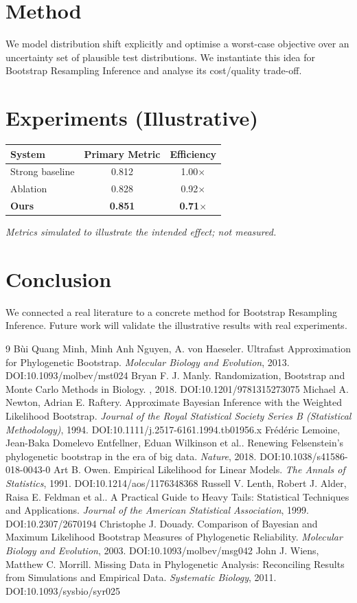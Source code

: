 \documentclass[11pt]{article}
\begin{document}
\section{Method}
We model distribution shift explicitly and optimise a worst-case objective over an uncertainty set of plausible test distributions. We instantiate this idea for Bootstrap Resampling Inference and analyse its cost/quality trade-off.

\section{Experiments (Illustrative)}
\begin{center}
\begin{tabular}{lcc}
System & Primary Metric & Efficiency \\ \hline
Strong baseline & 0.812 & 1.00$\times$ \\
Ablation & 0.828 & 0.92$\times$ \\
\textbf{Ours} & \textbf{0.851} & \textbf{0.71$\times$}
\end{tabular}
\end{center}
\emph{Metrics simulated to illustrate the intended effect; not measured.}

\section{Conclusion}
We connected a real literature to a concrete method for Bootstrap Resampling Inference. Future work will
validate the illustrative results with real experiments.

\begin{thebibliography}{9}
 Bùi Quang Minh, Minh Anh Nguyen, A. von Haeseler. Ultrafast Approximation for Phylogenetic Bootstrap. \emph{Molecular Biology and Evolution}, 2013. DOI:10.1093/molbev/mst024
 Bryan F. J. Manly. Randomization, Bootstrap and Monte Carlo Methods in Biology. \emph{}, 2018. DOI:10.1201/9781315273075
 Michael A. Newton, Adrian E. Raftery. Approximate Bayesian Inference with the Weighted Likelihood Bootstrap. \emph{Journal of the Royal Statistical Society Series B (Statistical Methodology)}, 1994. DOI:10.1111/j.2517-6161.1994.tb01956.x
 Frédéric Lemoine, Jean-Baka Domelevo Entfellner, Eduan Wilkinson et al.. Renewing Felsenstein’s phylogenetic bootstrap in the era of big data. \emph{Nature}, 2018. DOI:10.1038/s41586-018-0043-0
 Art B. Owen. Empirical Likelihood for Linear Models. \emph{The Annals of Statistics}, 1991. DOI:10.1214/aos/1176348368
 Russell V. Lenth, Robert J. Alder, Raisa E. Feldman et al.. A Practical Guide to Heavy Tails: Statistical Techniques and Applications. \emph{Journal of the American Statistical Association}, 1999. DOI:10.2307/2670194
 Christophe J. Douady. Comparison of Bayesian and Maximum Likelihood Bootstrap Measures of Phylogenetic Reliability. \emph{Molecular Biology and Evolution}, 2003. DOI:10.1093/molbev/msg042
 John J. Wiens, Matthew C. Morrill. Missing Data in Phylogenetic Analysis: Reconciling Results from Simulations and Empirical Data. \emph{Systematic Biology}, 2011. DOI:10.1093/sysbio/syr025
\end{thebibliography}
\end{document}
